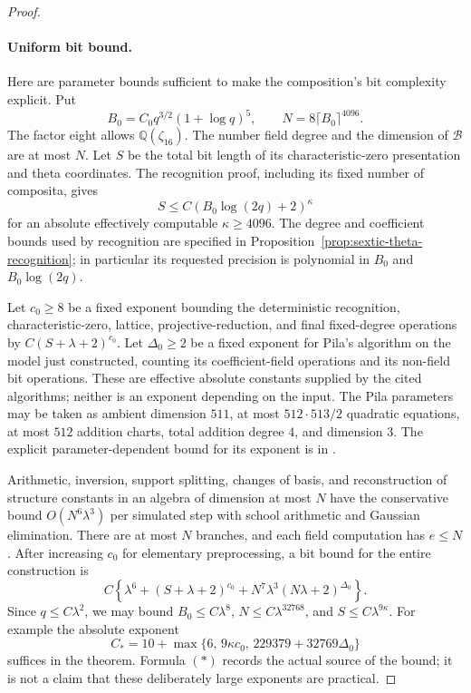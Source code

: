 \documentclass[11pt]{article}
\theoremstyle{definition}
\theoremstyle{remark}
\begin{document}
\begin{proof}
\paragraph{Uniform bit bound.}
Here are parameter bounds sufficient to make the composition's
bit complexity explicit. Put
\[
 B_0=C_0q^{3/2}(1+\log q)^5,
 \qquad N=8\lceil B_0\rceil^{4096}.
\]
The factor eight allows \(\mathbb Q(\zeta_{16})\). The number
field degree and the dimension of \(\mathcal B\) are at most
\(N\). Let \(S\) be the total bit length of its
characteristic-zero presentation and theta coordinates. The
recognition proof, including its fixed number of composita,
gives
\[
 S\le C(B_0\log(2q)+2)^\kappa
\]
for an absolute effectively computable \(\kappa\ge4096\).
The degree and coefficient bounds used by recognition are
specified in Proposition~\ref{prop:sextic-theta-recognition};
in particular its requested precision is polynomial in
\(B_0\) and \(B_0\log(2q)\).

Let \(c_0\ge8\) be a fixed exponent bounding the deterministic
recognition, characteristic-zero, lattice, projective-reduction, and final
fixed-degree operations by \(C(S+\lambda+2)^{c_0}\).
Let \(\Delta_0\ge2\) be a fixed exponent for Pila's algorithm
on the model just constructed, counting its coefficient-field
operations and its non-field bit operations. These are effective
absolute constants supplied by the cited algorithms; neither
is an exponent depending on the input. The Pila parameters may
be taken as ambient dimension \(511\), at most
\(512\cdot513/2\) quadratic equations, at most \(512\)
addition charts, total addition degree \(4\), and dimension
\(3\). The explicit parameter-dependent bound for its exponent
is in \citet[Section~4, author pp.~12--14]{Pila1990}.

Arithmetic, inversion, support splitting, changes of basis, and
reconstruction of structure constants in an algebra of dimension at
most \(N\) have the conservative bound \(O(N^6\lambda^3)\)
per simulated step with school arithmetic and Gaussian elimination. There are at most
\(N\) branches, and each field computation has
\(e\le N\). After increasing \(c_0\) for elementary
preprocessing, a bit bound for the entire construction is
\[
 C\left\{\lambda^6+(S+\lambda+2)^{c_0}
             +N^7\lambda^3(N\lambda+2)^{\Delta_0}\right\}.
 \tag{\(\ast\)}\label{eq:composed-cubic-bit-bound}
\]
Since \(q\le C\lambda^2\), we may bound
\(B_0\le C\lambda^8\),
\(N\le C\lambda^{32768}\), and
\(S\le C\lambda^{9\kappa}\).
For example the absolute exponent
\[
 C_* = 10+\max\{6,\,9\kappa c_0,\,
                     229379+32769\Delta_0\}
\]
suffices in the theorem. Formula \((\ast)\) records the actual
source of the bound; it is not a claim that these deliberately
large exponents are practical.


\end{proof}
\end{document}
